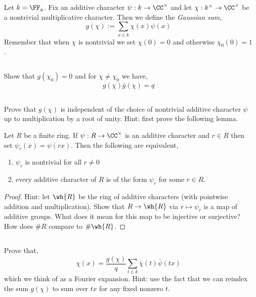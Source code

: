 \documentclass[12pt]{article}
\begin{document}
Let $k = \FF_q$. Fix an additive character $\psi : k \to \CC^\times$ and let $\chi :  k^\times \to \CC^\times$ be a nontrivial multiplicative character. Then we define the \textit{Gaussian sum},
\[ g(\chi) := \sum_{x \in k} \chi(x) \psi(x) \]
Remember that when $\chi$ is nontrivial we set $\chi(0) = 0$ and otherwise $\chi_0(0) = 1$. 

\subsection{}

Show that $g(\chi_0) = 0$ and for $\chi \neq \chi_0$ we have,
\[ g(\chi) \bar{g}(\chi) = q \]

\subsection{}

Prove that $g(\chi)$ is independent of the choice of nontrivial additive character $\psi$ up to multiplication by a root of unity. Hint: first prove the following lemma.

\begin{lemma}
Let $R$ be a finite ring. If $\psi : R \to \CC^\times$ is an additive character and $r \in R$ then set $\psi_r(x) = \psi(rx)$. Then the following are equivalent,
\begin{enumerate}
\item $\psi_r$ is nontrivial for all $r \neq 0$
\item every additive character of $R$ is of the form $\psi_r$ for some $r \in R$.
\end{enumerate}
\end{lemma} 

\begin{proof}
Hint: let $\wh{R}$ be the ring of additive characters (with pointwise addition and multiplication). Show that $R \to \wh{R}$ via $r \mapsto \psi_r$ is a map of additive groups. What does it mean for this map to be injective or surjective? How does $\# R$ compare to $\# \wh{R}$.
\end{proof}

\subsection{}

Prove that,
\[ \chi(x) = \frac{g(\chi)}{q} \sum_{t \in k} \bar{\chi}(t) \bar{\psi}(tx) \]
which we think of as a Fourier expansion. Hint: use the fact that we can reindex the sum $g(\chi)$ to sum over $t x$ for any fixed nonzero $t$.
\end{document}
